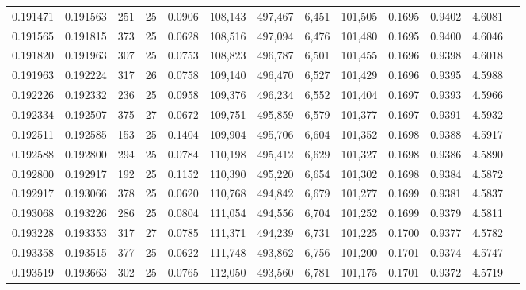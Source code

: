\begin{tabular}{rrrrrrrrrrrrr}
0.191471 & 0.191563 &   251 &  25 &                                     0.0906 & 108,143 & 497,467 &   6,451 & 101,505 & 0.1695 & 0.9402 & 4.6081 \\
0.191565 & 0.191815 &   373 &  25 &                                     0.0628 & 108,516 & 497,094 &   6,476 & 101,480 & 0.1695 & 0.9400 & 4.6046 \\
0.191820 & 0.191963 &   307 &  25 &                                     0.0753 & 108,823 & 496,787 &   6,501 & 101,455 & 0.1696 & 0.9398 & 4.6018 \\
0.191963 & 0.192224 &   317 &  26 &                                     0.0758 & 109,140 & 496,470 &   6,527 & 101,429 & 0.1696 & 0.9395 & 4.5988 \\
0.192226 & 0.192332 &   236 &  25 &                                     0.0958 & 109,376 & 496,234 &   6,552 & 101,404 & 0.1697 & 0.9393 & 4.5966 \\
0.192334 & 0.192507 &   375 &  27 &                                     0.0672 & 109,751 & 495,859 &   6,579 & 101,377 & 0.1697 & 0.9391 & 4.5932 \\
0.192511 & 0.192585 &   153 &  25 &                                     0.1404 & 109,904 & 495,706 &   6,604 & 101,352 & 0.1698 & 0.9388 & 4.5917 \\
0.192588 & 0.192800 &   294 &  25 &                                     0.0784 & 110,198 & 495,412 &   6,629 & 101,327 & 0.1698 & 0.9386 & 4.5890 \\
0.192800 & 0.192917 &   192 &  25 &                                     0.1152 & 110,390 & 495,220 &   6,654 & 101,302 & 0.1698 & 0.9384 & 4.5872 \\
0.192917 & 0.193066 &   378 &  25 &                                     0.0620 & 110,768 & 494,842 &   6,679 & 101,277 & 0.1699 & 0.9381 & 4.5837 \\
0.193068 & 0.193226 &   286 &  25 &                                     0.0804 & 111,054 & 494,556 &   6,704 & 101,252 & 0.1699 & 0.9379 & 4.5811 \\
0.193228 & 0.193353 &   317 &  27 &                                     0.0785 & 111,371 & 494,239 &   6,731 & 101,225 & 0.1700 & 0.9377 & 4.5782 \\
0.193358 & 0.193515 &   377 &  25 &                                     0.0622 & 111,748 & 493,862 &   6,756 & 101,200 & 0.1701 & 0.9374 & 4.5747 \\
0.193519 & 0.193663 &   302 &  25 &                                     0.0765 & 112,050 & 493,560 &   6,781 & 101,175 & 0.1701 & 0.9372 & 4.5719 \\

\end{tabular}
